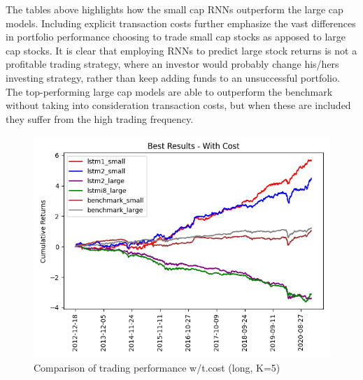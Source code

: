 \indent\newline
\begin{table}[ht]
\centering
{}
\caption{Comparison of top models w/t.costs (long, K=5)}
\end{table}
\indent\newline
The tables above highlights how the small cap RNNs outperform the large cap models. Including explicit transaction costs further emphasize the vast differences in portfolio performance choosing to trade small cap stocks as apposed to large cap stocks. It is clear that employing RNNs to predict large stock returns is not a profitable trading strategy, where an investor would probably change his/hers investing strategy, rather than keep adding funds to an unsuccessful portfolio. The top-performing large cap models are able to outperform the benchmark without taking into consideration transaction costs, but when these are included they suffer from the high trading frequency.       
\indent\newline 
\begin{figure}[H]
\centering
\includegraphics [scale=0.60,angle=360]{figures/cumulative_best_mix_cap_return_cost.png}
\caption{Comparison of trading performance w/t.cost (long, K=5)}
\label{fig:mixcost}
\end{figure} 
